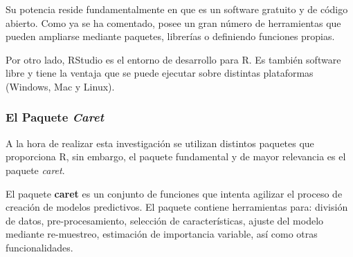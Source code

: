 Su potencia reside fundamentalmente en que es un software gratuito y de código abierto. Como ya se ha comentado, posee un gran número de herramientas que pueden ampliarse mediante paquetes, librerías o definiendo funciones propias.

Por otro lado, RStudio es el entorno de desarrollo para R. Es también software libre y tiene la ventaja que se puede ejecutar sobre distintas plataformas (Windows, Mac y Linux).

\subsubsection{El Paquete \textit{Caret}}
A la hora de realizar esta investigación se utilizan distintos paquetes que proporciona R, sin embargo, el paquete fundamental y de mayor relevancia es el paquete \textit{caret}.

El paquete \textbf{caret} es un conjunto de funciones que intenta agilizar el proceso de creación de modelos predictivos. El paquete contiene herramientas para: división de datos, pre-procesamiento, selección de características, ajuste del modelo mediante re-muestreo, estimación de importancia variable, así como otras funcionalidades. \cite{CARET2019}



